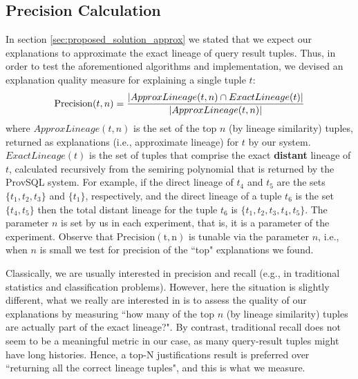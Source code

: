 \subsection{Precision Calculation}\label{sec:precision}
In section \ref{sec:proposed_solution_approx} we stated that we expect our explanations to approximate the exact lineage of query result tuples. 
Thus, in order to test the aforementioned algorithms and implementation, we devised an explanation quality measure for explaining a single tuple $t$: 
\begin{equation*}
    \operatorname{Precision}(t, n) = \frac{|ApproxLineage(t, n) \cap ExactLineage(t)|}{|ApproxLineage(t, n)|}\\
\end{equation*}
where $ApproxLineage(t, n)$ is the set of the top $n$ (by lineage similarity) tuples, returned as explanations (i.e., approximate lineage) for $t$ by our system. $ExactLineage(t)$ is the set of tuples that comprise the exact \textbf{distant} lineage of $t$, calculated recursively from the semiring polynomial that is returned by the ProvSQL system.
For example, if the direct lineage of $t_4$ and $t_5$ are the sets $\{t_1, t_2, t_3\}$ and $\{t_1\}$, respectively, and the direct lineage of a tuple $t_6$ is the set $\{t_4, t_5\}$ then the total distant lineage for the tuple $t_6$ is $\{t_1, t_2, t_3, t_4, t_5\}$.
The parameter $n$ is set by us in each experiment, that is, it is a parameter of the experiment. 
Observe that $\operatorname{Precision(t, n)}$ is tunable via the parameter $n$, i.e., when $n$ is small we test for precision of the ``top" explanations we found.\\
\par Classically, we are usually interested in precision and recall (e.g., in traditional statistics and classification problems). However, here the situation is slightly different, what we really are interested in is to assess the quality of our explanations by measuring ``how many of the top $n$ (by lineage similarity) tuples are actually part of the exact lineage?". By contrast, traditional recall does not seem to be a meaningful metric in our case, as many query-result tuples might have long histories. Hence, a top-N justifications result is preferred over ``returning all the correct lineage tuples", and this is what we measure.


